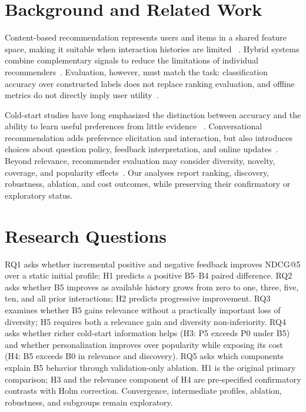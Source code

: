 \documentclass[sigconf,anonymous,review,natbib=false]{acmart}
\begin{document}
\section{Background and Related Work}

Content-based recommendation represents users and items in a shared feature
space, making it suitable when interaction histories are limited
~\cite{lops2011content}. Hybrid systems combine complementary signals to reduce
the limitations of individual recommenders~\cite{burke2002hybrid}. Evaluation,
however, must match the task: classification accuracy over constructed labels
does not replace ranking evaluation, and offline metrics do not directly imply
user utility~\cite{herlocker2004evaluating}.

Cold-start studies have long emphasized the distinction between accuracy and
the ability to learn useful preferences from little evidence
~\cite{schein2002methods}. Conversational recommendation adds preference
elicitation and interaction, but also introduces choices about question policy,
feedback interpretation, and online updates~\cite{jannach2021survey}. Beyond
relevance, recommender evaluation may consider diversity, novelty, coverage,
and popularity effects~\cite{castells2022novelty}. Our analyses report ranking, discovery, robustness, ablation, and cost outcomes,
while preserving their confirmatory or exploratory status.

\section{Research Questions}

RQ1 asks whether incremental positive and negative feedback improves NDCG@5
over a static initial profile; H1 predicts a positive B5--B4 paired difference.
RQ2 asks whether B5 improves as available history grows from zero to one, three,
five, ten, and all prior interactions; H2 predicts progressive improvement.
RQ3 examines whether B5 gains relevance without a practically important loss
of diversity; H5 requires both a relevance gain and diversity non-inferiority.
RQ4 asks whether richer cold-start information helps (H3: P5 exceeds P0 under
B5) and whether personalization improves over popularity while exposing its
cost (H4: B5 exceeds B0 in relevance and discovery). RQ5 asks which components
explain B5 behavior through validation-only ablation. H1 is the original
primary comparison; H3 and the relevance component of H4 are pre-specified
confirmatory contrasts with Holm correction. Convergence, intermediate
profiles, ablation, robustness, and subgroups remain exploratory.
\end{document}
